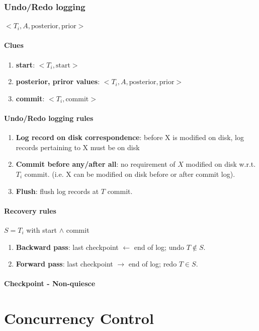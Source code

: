 \documentclass[a4paper]{report}
\begin{document}
\subsection{Undo/Redo logging}
$<T_i, A, \text{posterior}, \text{prior}>$
\subsubsection{Clues}
\begin{enumerate}
\item \textbf{start}: $<T_i, \text{start}>$
\item \textbf{posterior, priror values}: $<T_i, A, \text{posterior}, \text{prior}>$
\item \textbf{commit}: $<T_i, \text{commit}>$
\end{enumerate}

\subsubsection{Undo/Redo logging rules}
\begin{enumerate}
\item \textbf{Log record on disk  correspondence}: before X is modified on disk, log records pertaining to X must be on disk
\item \textbf{Commit before any/after all}: no requirement of $X$ modified on disk w.r.t. $T_i$ commit. (i.e. X can be modified on disk before or after commit log).
\item \textbf{Flush}: flush log records at $T$ commit. 
\end{enumerate}

\subsubsection{Recovery rules}
$S = T_i$ with start $\wedge$ commit
\begin{enumerate}
\item \textbf{Backward pass}: last checkpoint $\leftarrow$ end of log; undo $T \notin S$.
\item \textbf{Forward pass}: last checkpoint $\rightarrow$ end of log; redo $T \in S$.
\end{enumerate}

\subsubsection{Checkpoint - Non-quiesce}


\chapter{Concurrency Control}
\end{document}
